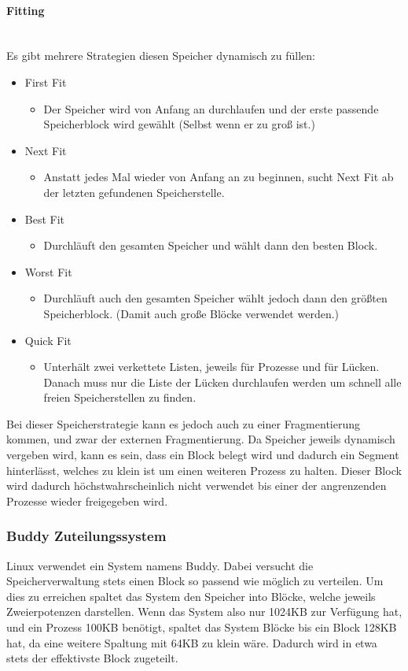 \documentclass{article}
\newcommand{\paragraphlb}[1]{\paragraph{#1}\mbox{}\\}
\begin{document}
	\paragraphlb{Fitting}
	Es gibt mehrere Strategien diesen Speicher dynamisch zu füllen:
	\begin{itemize}
		\item{First Fit}
		\begin{itemize}
			\item{Der Speicher wird von Anfang an durchlaufen und der erste passende Speicherblock wird gewählt (Selbst wenn er zu groß ist.)}
		\end{itemize}
		\item{Next Fit}
		\begin{itemize}
			\item{Anstatt jedes Mal wieder von Anfang an zu beginnen, sucht Next Fit ab der letzten gefundenen Speicherstelle.}
		\end{itemize}
		\item{Best Fit}
		\begin{itemize}
			\item{Durchläuft den gesamten Speicher und wählt dann den besten Block.}
		\end{itemize}
		\item{Worst Fit}
		\begin{itemize}
			\item{Durchläuft auch den gesamten Speicher wählt jedoch dann den größten Speicherblock. (Damit auch große Blöcke verwendet werden.)}
		\end{itemize}
		\item{Quick Fit}
		\begin{itemize}
			\item{Unterhält zwei verkettete Listen, jeweils für Prozesse und für Lücken. Danach muss nur die Liste der Lücken durchlaufen werden um schnell alle freien Speicherstellen zu finden.}
		\end{itemize}
	\end{itemize}
	Bei dieser Speicherstrategie kann es jedoch auch zu einer Fragmentierung kommen, und zwar der externen Fragmentierung. Da Speicher jeweils dynamisch vergeben wird, kann es sein, dass ein Block belegt wird und dadurch ein Segment hinterlässt, welches zu klein ist um einen weiteren Prozess zu halten. Dieser Block wird dadurch höchstwahrscheinlich nicht verwendet bis einer der angrenzenden Prozesse wieder freigegeben wird.
	\subsubsection{Buddy Zuteilungssystem}
	Linux verwendet ein System namens Buddy. Dabei versucht die Speicherverwaltung stets einen Block so passend wie möglich zu verteilen. Um dies zu erreichen spaltet das System den Speicher into Blöcke, welche jeweils Zweierpotenzen darstellen. Wenn das System also nur 1024KB zur Verfügung hat, und ein Prozess 100KB benötigt, spaltet das System Blöcke bis ein Block 128KB hat, da eine weitere Spaltung mit 64KB zu klein wäre. Dadurch wird in etwa stets der effektivste Block zugeteilt. \\
\end{document}

